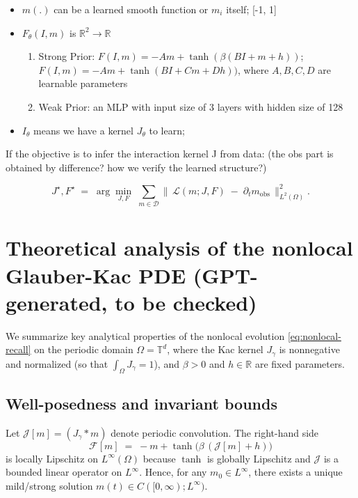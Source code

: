 \documentclass[11pt,a4paper]{article}
\begin{document}
\begin{itemize}
    \item $m(.)$ can be a learned smooth function or $m_i$ itself; [-1, 1]
    \item $F_\theta(I,m)$ is $\mathbb{R}^2 \to \mathbb{R}$
    \begin{enumerate}
        \item Strong Prior: $F(I, m)=-Am+\tanh(\beta(BI+m+h))$; $F(I, m)=-Am+\tanh(BI+Cm+Dh))$, where $A,B,C,D$ are learnable parameters
        \item Weak Prior: an MLP with input size of 3 layers with hidden size of 128
    \end{enumerate}
    \item $I_\theta$ means we have a kernel $J_\theta$ to learn;
\end{itemize}


If the objective is to infer the interaction kernel J from data: 
(the obs part is obtained by difference? how we verify the learned structure?)

\begin{equation}
    J^\star, F^\star \;=\; \arg\min_{J, F}\;
\sum_{m \in \mathcal{D}}
\bigl\|\, \mathcal{L}(m;J,F)\;-\;\partial_t m_{\mathrm{obs}} \,\bigr\|_{L^2(\Omega)}^{2}.
\end{equation}


\section{Theoretical analysis of the nonlocal Glauber-Kac PDE (GPT-generated, to be checked)} 
\label{sec:nonlocal_theory}

We summarize key analytical properties of the nonlocal evolution \eqref{eq:nonlocal-recall} on the periodic domain $\Omega=\mathbb{T}^d$, where the Kac kernel $J_\gamma$ is nonnegative and normalized (so that $\int_\Omega J_\gamma = 1$), and $\beta>0$ and $h\in\mathbb{R}$ are fixed parameters.

\subsection{Well-posedness and invariant bounds}
Let $\mathcal{J}[m] = (J_\gamma * m)$ denote periodic convolution. The right-hand side
\[
\mathcal{F}[m] \;=\; -m + \tanh\big(\beta\,(\mathcal{J}[m] + h)\big)
\]
is locally Lipschitz on $L^\infty(\Omega)$ because $\tanh$ is globally Lipschitz and $\mathcal{J}$ is a bounded linear operator on $L^\infty$. Hence, for any $m_0\in L^\infty$, there exists a unique mild/strong solution $m(t)\in C([0,\infty);L^\infty)$.
\end{document}
